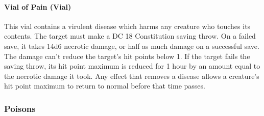     \paragraph{Vial of Pain (Vial)} %
        This vial contains a virulent disease which harms any creature who touches its contents.
        The target must make a DC 18 Constitution saving throw.
        On a failed save, it takes 14d6 necrotic damage, or half as much damage on a successful save.
        The damage can't reduce the target's hit points below 1.
        If the target fails the saving throw, its hit point maximum is reduced for 1 hour by an amount equal to the necrotic damage it took.
        Any effect that removes a disease allows a creature's hit point maximum to return to normal before that time passes.
\newpage

\subsubsection{Poisons}
